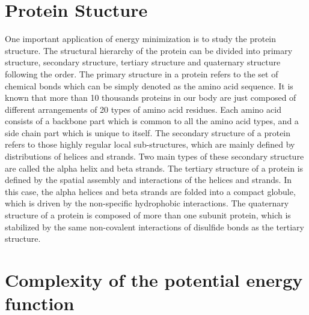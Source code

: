 \documentclass{article} %
\begin{document}
\section{Protein Stucture}
One important application of energy minimization is to study the protein structure. The structural hierarchy of the protein can
 be divided into primary structure, secondary structure, tertiary structure and quaternary structure following the order\cite{protein}. 
The primary structure in a protein refers to the set of chemical bonds which can be simply denoted as the amino acid sequence. 
It is known that more than 10 thousands proteins in our body are just composed of different arrangements of 20 types of amino acid
residues. Each amino acid consists of a backbone part which is common to all the amino acid types, and a side chain part which is
unique to itself.  The secondary structure of a protein refers to those highly regular local sub-structures, which are mainly defined
by distributions of helices and strands. Two main types of these secondary structure are called the alpha helix and beta strands.
The tertiary structure of a protein is defined by the spatial assembly and interactions of the helices and strands. In this case,
the alpha helices and beta strands are folded into a compact globule, which is driven by the non-specific hydrophobic interactions.
The quaternary structure of a protein is composed of more than one subunit protein, which is stabilized by the same non-covalent 
interactions of disulfide bonds as the tertiary structure.

\section{Complexity of the potential energy function}
\end{document}
